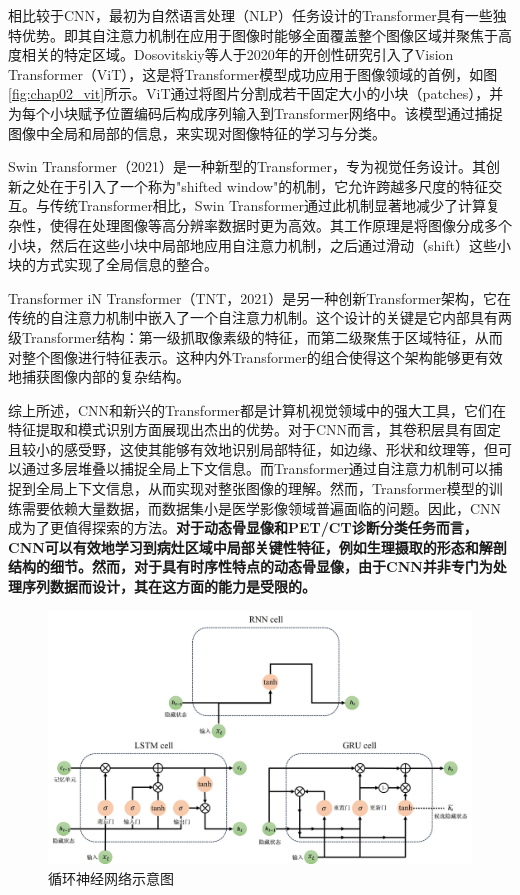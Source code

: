 相比较于CNN，最初为自然语言处理（NLP）任务设计的Transformer具有一些独特优势。即其自注意力机制在应用于图像时能够全面覆盖整个图像区域并聚焦于高度相关的特定区域。Dosovitskiy等人\cite{dosovitskiy2020image}于2020年的开创性研究引入了Vision Transformer（ViT），这是将Transformer模型成功应用于图像领域的首例，如图\ref{fig:chap02_vit}所示。ViT通过将图片分割成若干固定大小的小块（patches），并为每个小块赋予位置编码后构成序列输入到Transformer网络中。该模型通过捕捉图像中全局和局部的信息，来实现对图像特征的学习与分类。

Swin Transformer\cite{liu2021swin}（2021）是一种新型的Transformer，专为视觉任务设计。其创新之处在于引入了一个称为"shifted window"的机制，它允许跨越多尺度的特征交互。与传统Transformer相比，Swin Transformer通过此机制显著地减少了计算复杂性，使得在处理图像等高分辨率数据时更为高效。其工作原理是将图像分成多个小块，然后在这些小块中局部地应用自注意力机制，之后通过滑动（shift）这些小块的方式实现了全局信息的整合。

Transformer iN Transformer\cite{han2021transformer}（TNT，2021）是另一种创新Transformer架构，它在传统的自注意力机制中嵌入了一个自注意力机制。这个设计的关键是它内部具有两级Transformer结构：第一级抓取像素级的特征，而第二级聚焦于区域特征，从而对整个图像进行特征表示。这种内外Transformer的组合使得这个架构能够更有效地捕获图像内部的复杂结构。

综上所述，CNN和新兴的Transformer都是计算机视觉领域中的强大工具，它们在特征提取和模式识别方面展现出杰出的优势。对于CNN而言，其卷积层具有固定且较小的感受野，这使其能够有效地识别局部特征，如边缘、形状和纹理等，但可以通过多层堆叠以捕捉全局上下文信息。而Transformer通过自注意力机制可以捕捉到全局上下文信息，从而实现对整张图像的理解。然而，Transformer模型的训练需要依赖大量数据，而数据集小是医学影像领域普遍面临的问题。因此，CNN成为了更值得探索的方法。\textbf{对于动态骨显像和PET/CT诊断分类任务而言，CNN可以有效地学习到病灶区域中局部关键性特征，例如生理摄取的形态和解剖结构的细节。然而，对于具有时序性特点的动态骨显像，由于CNN并非专门为处理序列数据而设计，其在这方面的能力是受限的。}

\begin{figure}[htbp]
  \centering
  \includegraphics[width=\textwidth]{figures/chap02_rnn.jpg}
  \caption{循环神经网络示意图}
  \label{fig:chap02_rnn}
\end{figure}

